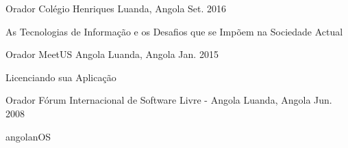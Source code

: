 


\begin{cventries}


\cventry
{Orador} %
{Colégio Henriques} %
{Luanda, Angola} %
{Set. 2016} %
{ %
\begin{cvitems}
\item {As Tecnologias de Informação e os Desafios que se Impõem na Sociedade Actual}
\end{cvitems}
}


\cventry
{Orador} %
{MeetUS Angola} %
{Luanda, Angola} %
{Jan. 2015} %
{ %
\begin{cvitems}
\item {Licenciando sua Aplicação}
\end{cvitems}
}


\cventry
{Orador} %
{Fórum Internacional de Software Livre - Angola} %
{Luanda, Angola} %
{Jun. 2008} %
{ %
\begin{cvitems}
\item {angolanOS}
\end{cvitems}
}



\end{cventries}

